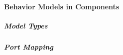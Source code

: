 
\paragraph{Behavior Models in Components}

\subparagraph{Model Types}

\subparagraph{Port Mapping}
